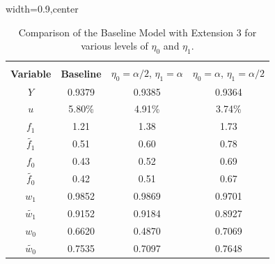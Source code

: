 \documentclass[12pt]{article} %
\theoremstyle{definition}
\begin{document}
\begin{table}[h!]
\begin{adjustbox}{width=0.9\columnwidth,center}

 \begin{tabular}{||c c c c||} 
 \hline
 \\[-1.1em]
 \textbf{Variable} & \textbf{Baseline} & $\eta_{0}=\alpha/2$, $\eta_{1} = \alpha$ & $\eta_{0}=\alpha$, $\eta_{1} = \alpha/2$\\  
 \hline\hline
  $Y$  & 0.9379 & 0.9385 & 0.9364\\ 
  $u$  & 5.80\% & 4.91\% & 3.74\% \\ 
  $f_{1}$  & 1.21 & 1.38 & 1.73 \\ 
  $\tilde{f_{1}}$  & 0.51 & 0.60 & 0.78\\
  $f_{0}$  &  0.43 & 0.52 & 0.69 \\
  $\tilde{f_{0}}$  & 0.42 & 0.51 & 0.67\\
  $w_{1}$  & 0.9852 & 0.9869 & 0.9701\\
  $\tilde{w_{1}}$ & 0.9152 & 0.9184 & 0.8927 \\
  $w_{0}$  & 0.6620 & 0.4870 & 0.7069\\
  $\tilde{w_{0}}$ & 0.7535 & 0.7097 & 0.7648\\ [1ex] 
 \hline
 \end{tabular}
\end{adjustbox}
\centering
     \captionsetup{justification=centering}
\caption{Comparison of the Baseline Model with Extension 3 for various levels of $\eta_{0}$ and $\eta_{1}$.} \label{table_ext3}
\end{table} 
 


\setlength{\bibsep}{0pt}

 
\end{document}
